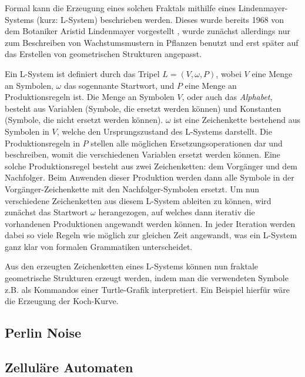 Formal kann die Erzeugung eines solchen Fraktals mithilfe eines Lindenmayer-Systems (kurz: L-System) beschrieben werden. Dieses wurde bereits 1968
von dem Botaniker Aristid Lindenmayer vorgestellt \cite{38_lindenmayer}, wurde zunächst allerdings nur zum Beschreiben von Wachstumsmustern in Pflanzen
benutzt und erst später auf das Erstellen von geometrischen Strukturen angepasst. \cite{39_lindenmayer_prusinkiewicz}

Ein L-System ist definiert durch das Tripel \(L = (V,\omega,P)\), wobei \(V\) eine Menge an Symbolen, \(\omega\) das sogennante Startwort, und
\(P\) eine Menge an Produktionsregeln ist. Die Menge an Symbolen \(V\), oder auch das \textit{Alphabet}, besteht aus Variablen (Symbole, die ersetzt
werden können) und Konstanten (Symbole, die nicht ersetzt werden können). \(\omega\) ist eine Zeichenkette bestehend aus Symbolen in \(V\), welche
den Ursprungszustand des L-Systems darstellt. Die Produktionsregeln in \(P\) stellen alle möglichen Ersetzungsoperationen dar und beschreiben, womit
die verschiedenen Variablen ersetzt werden können. Eine solche Produktionsregel besteht aus zwei Zeichenketten: dem Vorgänger und dem Nachfolger.
Beim Anwenden dieser Produktion werden dann alle Symbole in der Vorgänger-Zeichenkette mit den Nachfolger-Symbolen ersetzt. Um nun verschiedene
Zeichenketten aus diesem L-System ableiten zu können, wird zunächst das Startwort \(\omega\) herangezogen, auf welches dann iterativ die vorhandenen
Produktionen angewandt werden können. In jeder Iteration werden dabei so viele Regeln wie möglich zur gleichen Zeit angewandt, was ein L-System
ganz klar von formalen Grammatiken unterscheidet. \cite{39_lindenmayer_prusinkiewicz}

Aus den erzeugten Zeichenketten eines L-Systems können nun fraktale geometrische Strukturen erzeugt werden, indem man die verwendeten Symbole z.B.
als Kommandos einer Turtle-Grafik interpretiert. Ein Beispiel hierfür wäre die Erzeugung der Koch-Kurve. %

\subsection{Perlin Noise}

\subsection{Zelluläre Automaten}


